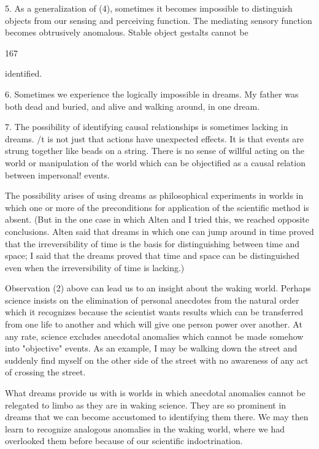 \documentclass[10pt,twoside]{memoir}
\begin{document}
\begin{enumerate}
{\begin{enumerate}
\begin{sysrules}
\begin{sysrules}
\begin{sysrules}
\begin{sysrules}
{\begin{enumerate}
{{{{{{{5. As a generalization of (4), sometimes it becomes impossible to distinguish 
objects from our sensing and perceiving function. The mediating sensory 
function becomes obtrusively anomalous. Stable object gestalts cannot be 


167 


identified. 

6. Sometimes we experience the logically impossible in dreams. My father 
was both dead and buried, and alive and walking around, in one dream. 

7. The possibility of identifying causal relationships is sometimes lacking in 
dreams. /t is not just that actions have unexpected effects. It is that events 
are strung together like beads on a string. There is no sense of willful acting 
on the world or manipulation of the world which can be objectified as a 
causal relation between impersonal! events. 

The possibility arises of using dreams as philosophical experiments in 
worlds in which one or more of the preconditions for application of the 
scientific method is absent. (But in the one case in which Alten and I tried 
this, we reached opposite conclusions. Alten said that dreams in which one 
can jump around in time proved that the irreversibility of time is the basis 
for distinguishing between time and space; I said that the dreams proved that 
time and space can be distinguished even when the irreversibility of time is 
lacking.) 

Observation (2) above can lead us to an insight about the waking world. 
Perhaps science insists on the elimination of personal anecdotes from the 
natural order which it recognizes because the scientist wants results which 
can be transferred from one life to another and which will give one person 
power over another. At any rate, science excludes anecdotal anomalies which 
cannot be made somehow into "objective" events. As an example, I may be 
walking down the street and suddenly find myself on the other side of the 
street with no awareness of any act of crossing the street. 

What dreams provide us with is worlds in which anecdotal anomalies 
cannot be relegated to limbo as they are in waking science. They are so 
prominent in dreams that we can become accustomed to identifying them 
there. We may then learn to recognize analogous anomalies in the waking 
world, where we had overlooked them before because of our scientific 
indoctrination. 

}}}}}}}
\end{enumerate}}
\end{sysrules}
\end{sysrules}
\end{sysrules}
\end{sysrules}
\end{enumerate}}
\end{enumerate}
\end{document}
